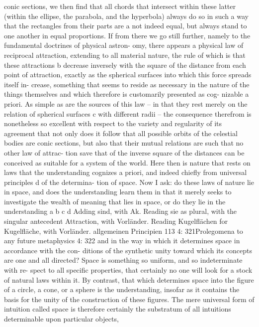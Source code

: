 conic sections, we then ﬁnd that all chords that intersect within these
latter (within the ellipse, the parabola, and the hyperbola) always do so
in such a way that the rectangles from their parts are a not indeed equal,
but always stand to one another in equal proportions. If from there we
go still further, namely to the fundamental doctrines of physical astron-
omy, there appears a physical law of reciprocal attraction, extending to
all material nature, the rule of which is that these attractions b decrease
inversely with the square of the distance from each point of attraction,
exactly as the spherical surfaces into which this force spreads itself in-
crease, something that seems to reside as necessary in the nature of the
things themselves and which therefore is customarily presented as cog-
nizable a priori. As simple as are the sources of this law – in that they
rest merely on the relation of spherical surfaces c with different radii –
the consequence therefrom is nonetheless so excellent with respect to
the variety and regularity of its agreement that not only does it follow
that all possible orbits of the celestial bodies are conic sections, but
also that their mutual relations are such that no other law of attrac-
tion save that of the inverse square of the distances can be conceived as
suitable for a system of the world.
Here then is nature that rests on laws that the understanding cognizes
a priori, and indeed chieﬂy from universal principles d of the determina-
tion of space. Now I ask: do these laws of nature lie in space, and does
the understanding learn them in that it merely seeks to investigate the
wealth of meaning that lies in space, or do they lie in the understanding
a
b
c
d
Adding sind, with Ak.
Reading sie as plural, with the singular antecedent Attraction, with Vorländer.
Reading Kugelﬂächen for Kugelﬂäche, with Vorländer.
allgemeinen Principien
113
4: 321Prolegomena to any future metaphysics
4: 322
and in the way in which it determines space in accordance with the con-
ditions of the synthetic unity toward which its concepts are one and all
directed? Space is something so uniform, and so indeterminate with re-
spect to all speciﬁc properties, that certainly no one will look for a stock
of natural laws within it. By contrast, that which determines space into
the ﬁgure of a circle, a cone, or a sphere is the understanding, insofar
as it contains the basis for the unity of the construction of these ﬁgures.
The mere universal form of intuition called space is therefore certainly
the substratum of all intuitions determinable upon particular objects,
